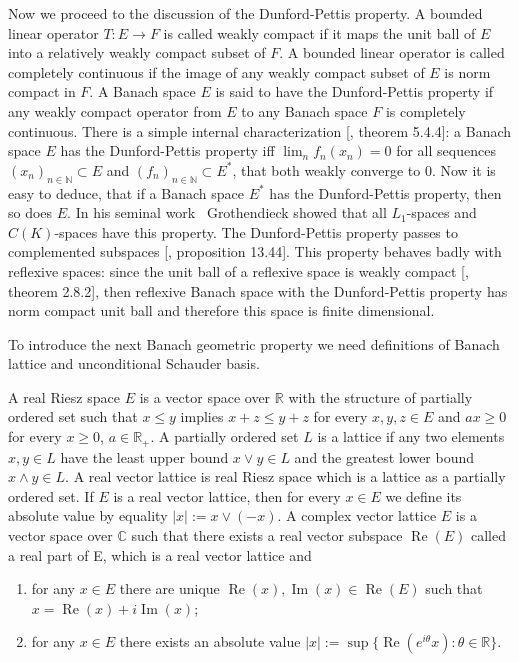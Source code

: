 Now we proceed to the discussion of the Dunford-Pettis property. A bounded
linear operator $T:E\to F$ is called weakly compact if it maps the unit ball of
$E$ into a relatively weakly compact subset of $F$. A bounded linear operator is
called completely continuous if the image of any weakly compact subset of $E$ is
norm compact in $F$. A Banach space $E$ is said to have the Dunford-Pettis
property if any weakly compact operator from $E$ to any Banach space $F$ is
completely continuous. There is a simple internal characterization
[\cite{KalAlbTopicsBanSpTh}, theorem 5.4.4]: a Banach space $E$ has the
Dunford-Pettis property iff $\lim_n f_n(x_n)=0$ for all sequences
${(x_n)}_{n\in\mathbb{N}}\subset E$ and ${(f_n)}_{n\in\mathbb{N}}\subset E^*$, 
that both weakly converge to $0$. Now it is easy to deduce, 
that if a Banach space $E^*$ has the Dunford-Pettis property, then so does $E$.
In his seminal work~\cite{GrothApllFaiblCompSpCK} Grothendieck showed that all
$L_1$-spaces and $C(K)$-spaces have this property. The Dunford-Pettis property
passes to complemented subspaces [\cite{FabHabBanSpTh}, proposition 13.44]. This
property behaves badly with reflexive spaces: since the unit ball of a reflexive
space is weakly compact [\cite{MeggIntroBanSpTh}, theorem 2.8.2], then reflexive
Banach space with the Dunford-Pettis property has norm compact unit ball and
therefore this space is finite dimensional. 

To introduce the next Banach geometric property we need definitions of Banach
lattice and unconditional Schauder basis. 

A real Riesz space $E$ is a vector space over $\mathbb{R}$ with the structure of
partially ordered set such that $x\leq y$ implies $x+z\leq y+z$ for every
$x,y,z\in E$ and $ax\geq 0$ for every $x\geq 0$, $a\in\mathbb{R}_+$. A partially
ordered set $L$ is a lattice if any two elements $x,y\in L$ have the least upper bound
$x\vee y\in L$ and the greatest lower bound $x\wedge y\in L$. A real vector lattice is
real Riesz space which is a lattice as a partially ordered set. If $E$ is a real
vector lattice, then for every $x\in E$ we define its absolute value by equality
$|x|:=x\vee(-x)$. A complex vector lattice $E$ is a vector space over
$\mathbb{C}$ such that there exists a real vector subspace
$\operatorname{Re}(E)$ called a real part of E, which is a real vector lattice and
\begin{enumerate}[label = (\roman*)]
  \item for any $x\in E$ there are unique
  $\operatorname{Re}(x),\operatorname{Im}(x)\in \operatorname{Re}(E)$ such that
  $x=\operatorname{Re}(x)+i\operatorname{Im}(x)$;

  \item for any $x\in E$ there exists an absolute value $|x|:=\sup
  \{\operatorname{Re}(e^{i\theta}x):\theta\in\mathbb{R} \}$.
\end{enumerate}

